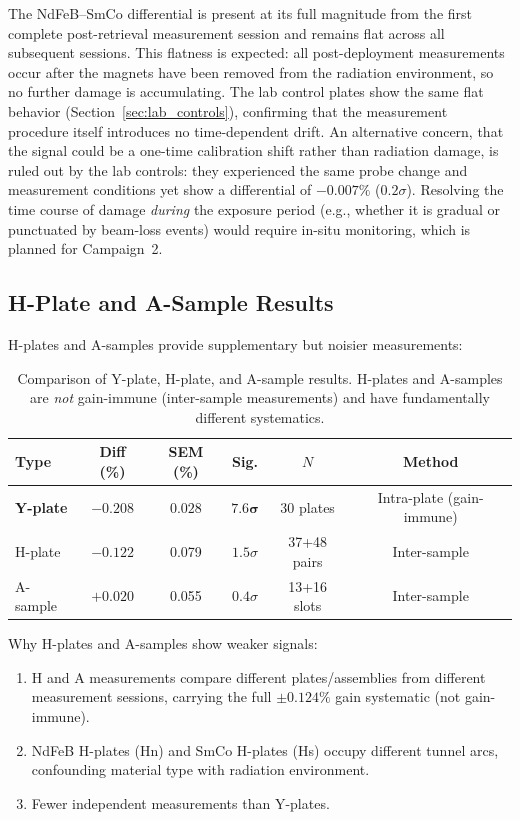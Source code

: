 \documentclass[11pt,letterpaper]{article}
\begin{document}
The NdFeB--SmCo differential is present at its full magnitude from the first
complete post-retrieval measurement session and remains flat across all
subsequent sessions. This flatness is expected: all post-deployment
measurements occur after the magnets have been removed from the radiation
environment, so no further damage is accumulating. The lab control plates show
the same flat behavior (Section~\ref{sec:lab_controls}), confirming that the
measurement procedure itself introduces no time-dependent drift. An alternative
concern, that the signal could be a one-time calibration shift rather than
radiation damage, is ruled out by the lab controls: they experienced the same
probe change and measurement conditions yet show a differential of $-0.007\%$
($0.2\sigma$). Resolving the time course of damage \emph{during} the exposure
period (e.g., whether it is gradual or punctuated by beam-loss events) would
require in-situ monitoring, which is planned for Campaign~2.

\subsection{H-Plate and A-Sample Results}
\label{sec:ha_results}

H-plates and A-samples provide supplementary but noisier measurements:

\begin{table}[H]
\centering
\caption{Comparison of Y-plate, H-plate, and A-sample results. H-plates and
A-samples are \emph{not} gain-immune (inter-sample measurements) and have
fundamentally different systematics.}
\label{tab:sample_types}
\begin{tabular}{@{}lccccc@{}}
\toprule
\textbf{Type} & \textbf{Diff (\%)} & \textbf{SEM (\%)} & \textbf{Sig.} &
$N$ & \textbf{Method} \\
\midrule
\textbf{Y-plate} & $\mathbf{-0.208}$ & $\mathbf{0.028}$ & $\mathbf{7.6\sigma}$ & 30 plates & Intra-plate (gain-immune) \\
H-plate & $-0.122$ & 0.079 & $1.5\sigma$ & 37+48 pairs & Inter-sample \\
A-sample & $+0.020$ & 0.055 & $0.4\sigma$ & 13+16 slots & Inter-sample \\
\bottomrule
\end{tabular}
\end{table}

Why H-plates and A-samples show weaker signals:
\begin{enumerate}
    \item H and A measurements compare different
    plates/assemblies from different measurement sessions, carrying the full
    $\pm 0.124\%$ gain systematic (not gain-immune).
    \item NdFeB H-plates (Hn) and SmCo H-plates
    (Hs) occupy different tunnel arcs, confounding material type with radiation
    environment.
    \item Fewer independent measurements than Y-plates.
\end{enumerate}
\end{document}
